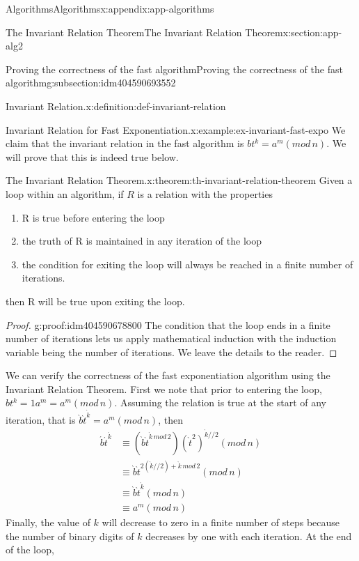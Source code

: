 \documentclass[twoside,10pt,]{book}
\numberwithin{equation}{section}
\begin{document}
\begin{appendixptx}{Algorithms}{}{Algorithms}{}{}{x:appendix:app-algorithms}
\begin{sectionptx}{The Invariant Relation Theorem}{}{The Invariant Relation Theorem}{}{}{x:section:app-alg2}
\begin{subsectionptx}{Proving the correctness of the fast algorithm}{}{Proving the correctness of the fast algorithm}{}{}{g:subsection:idm404590693552}
\begin{definition}{Invariant Relation.}{x:definition:def-invariant-relation}
\end{definition}
\begin{example}{Invariant Relation for Fast Exponentiation.}{x:example:ex-invariant-fast-expo}%
We claim that the invariant relation in the fast algorithm is \(b t^k = a^m (mod\,n)\).  We will prove that this is indeed true below.%
\end{example}
\begin{theorem}{The Invariant Relation Theorem.}{}{x:theorem:th-invariant-relation-theorem}%
Given a loop within an algorithm, if \(R\) is a relation with the properties%
\par
%
\begin{enumerate}[label=(\alph*)]
\item{}R is true before entering the loop%
\item{}the truth of R is maintained in any iteration of the loop%
\item{}the condition for exiting the loop will always be reached in a finite number of iterations.%
\end{enumerate}
%
\par
then R will be true upon exiting the loop.%
\end{theorem}
\begin{proof}{}{g:proof:idm404590678800}
The condition that the loop ends in a finite number of iterations lets us apply mathematical induction with the induction variable being the number of iterations.  We leave the details to the reader.%
\end{proof}
We can verify the correctness of the fast exponentiation algorithm using the Invariant Relation Theorem.  First we note that prior to entering the loop,  \(b t^k = 1 a^m = a^m (mod\,n)\).  Assuming the relation is true at the start of any iteration, that is \(\grave{b} \grave{t}^{\grave k} = a^m (mod\,n)\), then%
\begin{equation*}
\begin{split}
\acute{b} \acute{t}^{\acute{k}} & \equiv (\grave{b} \grave{t}^{\grave{k}\,mod\,2})(\grave t^2)^{ \grave k//2}(mod\,n)\\
& \equiv\grave{b} \grave{t}^{2(\grave{k}//2) +\grave{k}\,mod\,2 }(mod\,n) \\
& \equiv \grave{b} \grave{t}^{\grave{k}}(mod\,n)\\
& \equiv  a^m (mod\,n)
\end{split}
\end{equation*}
Finally, the value of \(k\) will decrease to zero in a finite number of steps because the number of binary digits of \(k\) decreases by one with each iteration.  At the end of the loop,%

\end{subsectionptx}
\end{sectionptx}
\end{appendixptx}
\end{document}
